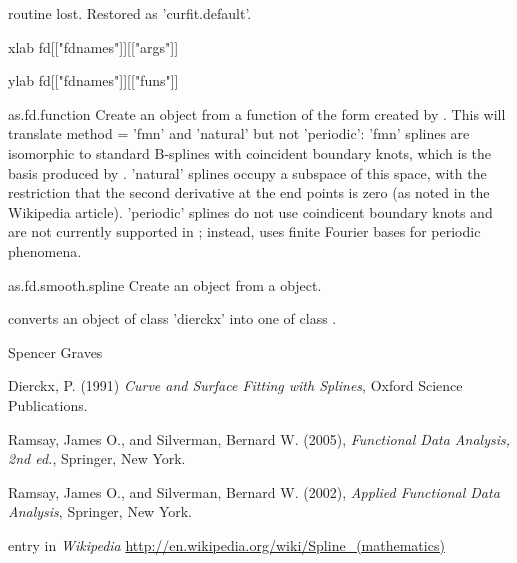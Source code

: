 \begin{Details}
{{\item[routine] lost.  Restored as 'curfit.default'.
\item[xlab] fd[["fdnames"]][["args"]]
\item[ylab] fd[["fdnames"]][["funs"]]
}


\item[as.fd.function] Create an  object from a function of the form created by
.  This will translate method = 'fmn' and
'natural' but not 'periodic':  'fmn' splines are isomorphic to
standard B-splines with coincident boundary knots, which is the
basis produced by .  'natural' splines
occupy a subspace of this space, with the restriction that the
second derivative at the end points is zero (as noted in the
Wikipedia  article).  'periodic' splines do not use
coindicent boundary knots and are not currently supported in
;  instead,  uses finite Fourier bases for
periodic phenomena.  


\item[as.fd.smooth.spline] Create an  object from a  object.

}
\end{Details}
\begin{Value}
 converts an object of class 'dierckx' into one of
class .
\end{Value}
\begin{Author}\relax
Spencer Graves
\end{Author}
\begin{References}\relax
Dierckx, P. (1991) \emph{Curve and Surface Fitting with Splines},
Oxford Science Publications.

Ramsay, James O., and Silverman, Bernard W. (2005), \emph{Functional 
Data Analysis, 2nd ed.}, Springer, New York. 

Ramsay, James O., and Silverman, Bernard W. (2002), \emph{Applied
Functional Data Analysis}, Springer, New York.

 entry in \emph{Wikipedia}
\url{http://en.wikipedia.org/wiki/Spline_(mathematics)}
\end{References}
\begin{SeeAlso}\relax
{}
\end{SeeAlso}
